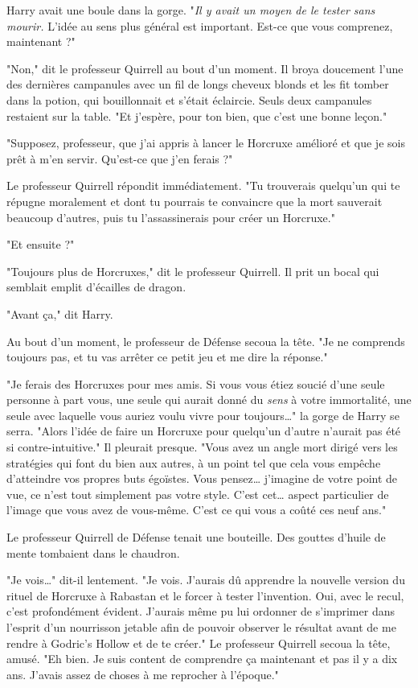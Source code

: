 Harry avait une boule dans la gorge. "\emph{Il y avait un moyen de le tester sans mourir.}  L'idée au sens plus général est important. Est-ce que vous comprenez, maintenant ?"

"Non," dit le professeur Quirrell au bout d'un moment. Il broya doucement l'une des dernières campanules avec un fil de longs cheveux blonds et les fit tomber dans la potion, qui bouillonnait et s'était éclaircie. Seuls deux campanules restaient sur la table. "Et j'espère, pour ton bien, que c'est une bonne leçon."

"Supposez, professeur, que j'ai appris à lancer le Horcruxe amélioré et que je sois prêt à m'en servir. Qu'est-ce que j'en ferais ?"

Le professeur Quirrell répondit immédiatement. "Tu trouverais quelqu'un qui te répugne moralement et dont tu pourrais te convaincre que la mort sauverait beaucoup d'autres, puis tu l'assassinerais pour créer un Horcruxe."

"Et ensuite ?"

"Toujours plus de Horcruxes," dit le professeur Quirrell. Il prit un bocal qui semblait emplit d'écailles de dragon.

"Avant ça," dit Harry.

Au bout d'un moment, le professeur de Défense secoua la tête. "Je ne comprends toujours pas, et tu vas arrêter ce petit jeu et me dire la réponse."

"Je ferais des Horcruxes pour mes amis. Si vous vous étiez soucié d'une seule personne à part vous, une seule qui aurait donné du \emph{sens}  à votre immortalité, une seule avec laquelle vous auriez voulu vivre pour toujours…" la gorge de Harry se serra. "Alors l'idée de faire un Horcruxe pour quelqu'un d'autre n'aurait pas été si contre-intuitive." Il pleurait presque. "Vous avez un angle mort dirigé vers les stratégies qui font du bien aux autres, à un point tel que cela vous empêche d'atteindre vos propres buts égoïstes. Vous pensez… j'imagine de votre point de vue, ce n'est tout simplement pas votre style. C'est cet… aspect particulier de l'image que vous avez de vous-même. C'est ce qui vous a coûté ces neuf ans."

Le professeur Quirrell de Défense tenait une bouteille. Des gouttes d'huile de mente tombaient dans le chaudron.

"Je vois…" dit-il lentement. "Je vois. J'aurais dû apprendre la nouvelle version du rituel de Horcruxe à Rabastan et le forcer à tester l'invention. Oui, avec le recul, c'est profondément évident. J'aurais même pu lui ordonner de s'imprimer dans l'esprit d'un nourrisson jetable afin de pouvoir observer le résultat avant de me rendre à Godric's Hollow et de te créer." Le professeur Quirrell secoua la tête, amusé. "Eh bien. Je suis content de comprendre ça maintenant et pas il y a dix ans. J'avais assez de choses à me reprocher à l'époque."

